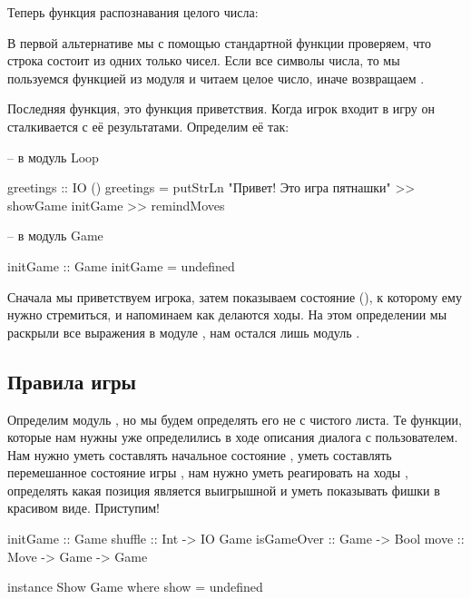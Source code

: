 Теперь функция распознавания целого числа:


В первой альтернативе мы с помощью стандартной
функции  проверяем, что 
строка состоит из одних только чисел. 
Если все символы числа, то мы пользуемся функцией из 
модуля  и читаем целое 
число, иначе возвращаем .

Последняя функция, это функция приветствия. Когда 
игрок входит в игру он сталкивается с её результатами.
Определим её так:

\begin{code}
-- в модуль Loop

greetings :: IO ()
greetings = putStrLn "Привет! Это игра пятнашки" >>
    showGame initGame >>
    remindMoves

-- в модуль Game

initGame :: Game
initGame = undefined
\end{code}

Сначала мы приветствуем игрока, затем показываем состояние
(), к которому ему нужно стремиться, и 
напоминаем как делаются ходы. 
На этом определении мы раскрыли все выражения в модуле ,
нам остался лишь модуль . 

\subsection{Правила игры}

Определим модуль , но мы будем определять его
не с чистого листа. Те функции, которые нам нужны уже
определились в ходе описания диалога с пользователем.
Нам нужно уметь составлять начальное состояние ,
уметь составлять перемешанное состояние игры ,
нам нужно уметь реагировать на ходы , определять
какая позиция является выигрышной  и уметь
показывать фишки в красивом виде. Приступим!

\begin{code}
initGame    :: Game
shuffle     :: Int -> IO Game
isGameOver  :: Game -> Bool
move        :: Move -> Game -> Game

instance Show Game where
    show = undefined
\end{code}


